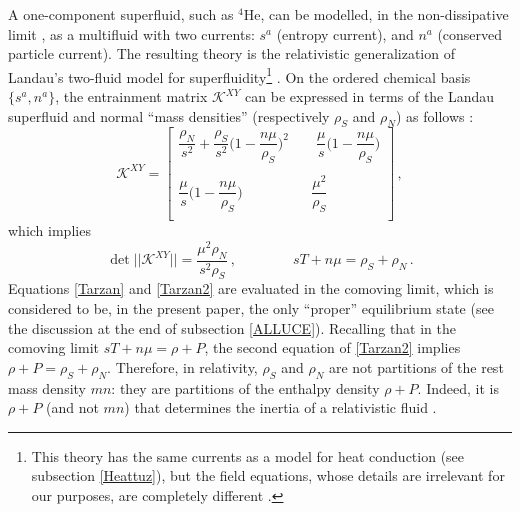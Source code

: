 \documentclass[a4paper, amsfonts, amssymb, amsmath, reprint, showkeys, nofootinbib, twoside, onecolumn,notitlepage]{revtex4-1}
\newcommand{\spc}{\quad \quad \quad}
\theoremstyle{definition}
\theoremstyle{theorem}
\begin{document}
A one-component superfluid, such as $^4$He, can be modelled, in the non-dissipative limit \cite{GavassinoKhalatnikov2021}, as a multifluid with two currents: $s^a$ (entropy current), and $n^a$ (conserved particle current). The resulting theory is the relativistic generalization of Landau's two-fluid model for superfluidity\footnote{This theory has the same currents as a model for heat conduction (see subsection \ref{Heattuz}), but the field equations, whose details are irrelevant for our purposes, are completely different \cite{noto_rel,cool1995}.} \cite{carter92}. On the ordered chemical basis $\{ s^a,n^a \}$, the entrainment matrix $\mathcal{K}^{XY}$ can be expressed in terms of the Landau superfluid and normal ``mass densities'' (respectively $\rho_S$ and $\rho_N$) as follows \cite{cool1995}:
\begin{equation}\label{Tarzan}
\mathcal{K}^{XY}=
\begin{bmatrix}
   \dfrac{\rho_N}{s^2} + \dfrac{\rho_S}{s^2}\bigg(1-\dfrac{n\mu}{\rho_S} \bigg)^2 & & \, \, \dfrac{\mu}{s} \bigg( 1-\dfrac{n\mu }{\rho_S} \bigg)  \\
     & &  \\
   \dfrac{\mu}{s} \bigg( 1-\dfrac{n\mu }{\rho_S} \bigg) & & \dfrac{\mu^2}{\rho_S} \\
\end{bmatrix} \, ,
\end{equation}
which implies
\begin{equation}\label{Tarzan2}
\det || \mathcal{K}^{XY} ||= \dfrac{\mu^2 \rho_N}{s^2 \rho_S} \, ,  \spc \quad sT+ n\mu = \rho_S + \rho_N \, .
\end{equation}
Equations \eqref{Tarzan} and \eqref{Tarzan2} are evaluated in the comoving limit, which is considered to be, in the present paper, the only ``proper'' equilibrium state (see the discussion at the end of subsection \ref{ALLUCE}). Recalling that in the comoving limit $sT+ n\mu =\rho+P$, the second equation of \eqref{Tarzan2} implies $\rho+P = \rho_S + \rho_N$. Therefore, in relativity, $\rho_S$ and $\rho_N$ are not partitions of the rest mass density $mn$: they are partitions of the enthalpy density $\rho+P$. Indeed, it is $\rho+P$ (and not $mn$) that determines the inertia of a relativistic fluid \cite{MTW_book}.
\end{document}
